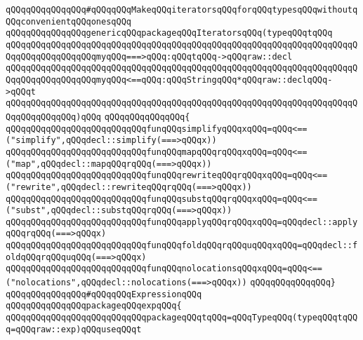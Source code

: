 \newline
\verb|qQQqqQQqqQQqqQQq#qQQqqQQqMakeqQQqiteratorsqQQqforqQQqtypesqQQqwithoutqQQqconvenientqQQqonesqQQq|\newline
\verb|qQQqqQQqqQQqqQQqgenericqQQqpackageqQQqIteratorsqQQq(typeqQQqtqQQq|\newline
\verb|qQQqqQQqqQQqqQQqqQQqqQQqqQQqqQQqqQQqqQQqqQQqqQQqqQQqqQQqqQQqqQQqqQQqqQQqqQQqqQQqqQQqqQQqmyqQQq===>qQQq:qQQqtqQQq->qQQqraw::decl|\newline
\verb|qQQqqQQqqQQqqQQqqQQqqQQqqQQqqQQqqQQqqQQqqQQqqQQqqQQqqQQqqQQqqQQqqQQqqQQqqQQqqQQqqQQqqQQqmyqQQq<==qQQq:qQQqStringqQQq*qQQqraw::declqQQq->qQQqt|\newline
\verb|qQQqqQQqqQQqqQQqqQQqqQQqqQQqqQQqqQQqqQQqqQQqqQQqqQQqqQQqqQQqqQQqqQQqqQQqqQQqqQQqqQQq)qQQq|\newline
\verb|qQQqqQQqqQQqqQQq{|\newline
\verb|qQQqqQQqqQQqqQQqqQQqqQQqqQQqfunqQQqsimplifyqQQqxqQQq=qQQq<==("simplify",qQQqdecl::simplify(===>qQQqx))|\newline
\verb|qQQqqQQqqQQqqQQqqQQqqQQqqQQqfunqQQqmapqQQqrqQQqxqQQq=qQQq<==("map",qQQqdecl::mapqQQqrqQQq(===>qQQqx))|\newline
\verb|qQQqqQQqqQQqqQQqqQQqqQQqqQQqfunqQQqrewriteqQQqrqQQqxqQQq=qQQq<==("rewrite",qQQqdecl::rewriteqQQqrqQQq(===>qQQqx))|\newline
\verb|qQQqqQQqqQQqqQQqqQQqqQQqqQQqfunqQQqsubstqQQqrqQQqxqQQq=qQQq<==("subst",qQQqdecl::substqQQqrqQQq(===>qQQqx))|\newline
\verb|qQQqqQQqqQQqqQQqqQQqqQQqqQQqfunqQQqapplyqQQqrqQQqxqQQq=qQQqdecl::applyqQQqrqQQq(===>qQQqx)|\newline
\verb|qQQqqQQqqQQqqQQqqQQqqQQqqQQqfunqQQqfoldqQQqrqQQquqQQqxqQQq=qQQqdecl::foldqQQqrqQQquqQQq(===>qQQqx)|\newline
\verb|qQQqqQQqqQQqqQQqqQQqqQQqqQQqfunqQQqnolocationsqQQqxqQQq=qQQq<==("nolocations",qQQqdecl::nolocations(===>qQQqx))|\newline
\verb|qQQqqQQqqQQqqQQq}|\newline
\newline
\newline
\verb|qQQqqQQqqQQqqQQq#qQQqqQQqExpressionqQQq|\newline
\verb|qQQqqQQqqQQqqQQqpackageqQQqexpqQQq{|\newline
\newline
\verb|qQQqqQQqqQQqqQQqqQQqqQQqqQQqpackageqQQqtqQQq=qQQqTypeqQQq(typeqQQqtqQQq=qQQqraw::exp)qQQquseqQQqt|\newline
\newline
